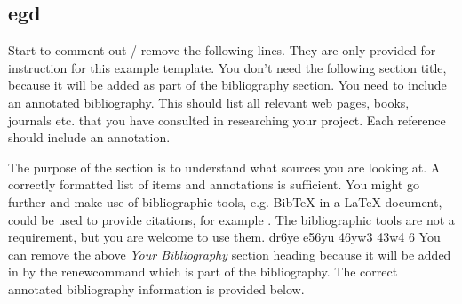 \documentclass[11pt,fleqn,twoside]{article}
\begin{document}
\subsection{egd}
Start to comment out / remove the following lines. They are only provided for instruction for this example template.  You don't need the following section title, because it will be added as part of the bibliography section. 
%
%
%
You need to include an annotated bibliography. This should list all relevant web pages, books, journals etc. that you have consulted in researching your project. Each reference should include an annotation. 

The purpose of the section is to understand what sources you are looking at.  A correctly formatted list of items and annotations is sufficient. You might go further and make use of bibliographic tools, e.g. BibTeX in a LaTeX document, could be used to provide citations, for example \cite{NumericalRecipes} \cite{MarksPaper} \cite[99-101]{FailBlog} \cite{kittenpic_ref}.  The bibliographic tools are not a requirement, but you are welcome to use them.   
dr6ye e56yu 46yw3 43w4 6
You can remove the above {\em Your Bibliography} section heading because it will be added in by the renewcommand which is part of the bibliography. The correct annotated bibliography information is provided below. 
%
%


\nocite{*} %

\newpage
{} 

%
%

\renewcommand{\refname}{Annotated Bibliography}  %
\end{document}
